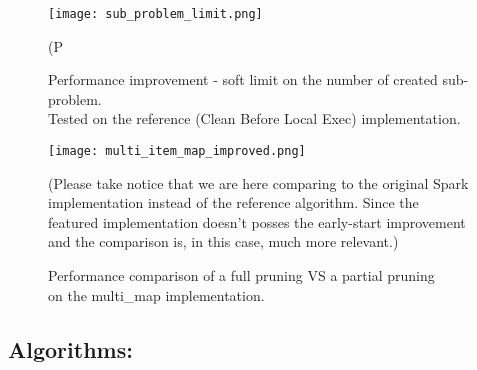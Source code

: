 \documentclass{eplmastersthesis}
\begin{document}
\begin{figure}[h]
  \centering
  \texttt{[image: sub\_problem\_limit.png]}
  \caption[Performance improvement - soft limit on the number of created sub-problem.]{
  		Performance improvement - soft limit on the number of created sub-problem. \\ 
  		Tested on the reference (Clean Before Local Exec) implementation.
  	\endtabular
  }
  (P
  \label{fig:sub_problem_limit}
\end{figure}

\begin{figure}[h]
  \centering
  \texttt{[image: multi\_item\_map\_improved.png]}
  \caption[PPIC with a map structure]{
  		Performance comparison of a full pruning VS a partial pruning \\ 
  		on the \textrm{multi\_map} implementation.
  	\endtabular
  }
  (Please take notice that we are here comparing to the original Spark implementation instead of the reference algorithm. Since the featured implementation doesn't posses the early-start improvement and the comparison is, in this case, much more relevant.)
  \label{fig:multi_map_comp}
\end{figure}

\clearpage
\subsection{Algorithms:}
\end{document}

